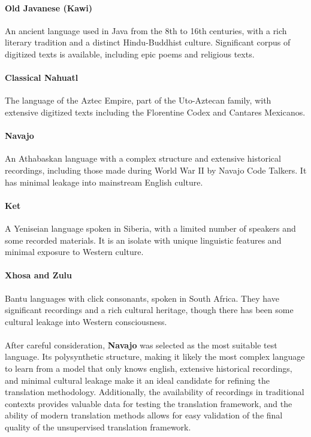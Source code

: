 \documentclass{article}
\begin{document}
\paragraph{Old Javanese (Kawi)} An ancient language used in Java from the 8th to 16th centuries, with a rich literary tradition and a distinct Hindu-Buddhist culture. Significant corpus of digitized texts is available, including epic poems and religious texts.

\paragraph{Classical Nahuatl} The language of the Aztec Empire, part of the Uto-Aztecan family, with extensive digitized texts including the Florentine Codex and Cantares Mexicanos. 

\paragraph{Navajo} An Athabaskan language with a complex structure and extensive historical recordings, including those made during World War II by Navajo Code Talkers. It has minimal leakage into mainstream English culture.

\paragraph{Ket} A Yeniseian language spoken in Siberia, with a limited number of speakers and some recorded materials. It is an isolate with unique linguistic features and minimal exposure to Western culture.

\paragraph{Xhosa and Zulu} Bantu languages with click consonants, spoken in South Africa. They have significant recordings and a rich cultural heritage, though there has been some cultural leakage into Western consciousness. \\ \\
After careful consideration, \textbf{Navajo} was selected as the most suitable test language. Its polysynthetic structure, making it likely the most complex language to learn from a model that only knows english, extensive historical recordings, and minimal cultural leakage make it an ideal candidate for refining the translation methodology. Additionally, the availability of recordings in traditional contexts provides valuable data for testing the translation framework, and the ability of modern translation methods allows for easy validation of the final quality of the unsupervised translation framework.
\end{document}
